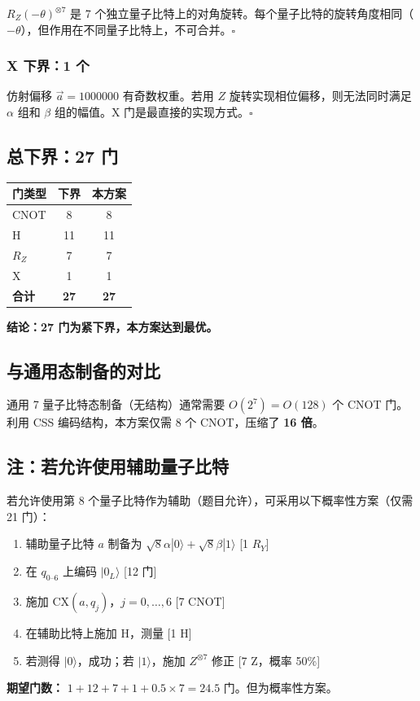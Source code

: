 \documentclass[12pt,a4paper]{ctexart}
\begin{document}
$R_Z(-\theta)^{\otimes 7}$ 是 7 个独立量子比特上的对角旋转。每个量子比特的旋转角度相同（$-\theta$），但作用在不同量子比特上，不可合并。\hfill $\square$

\subsubsection*{X 下界：1 个}

仿射偏移 $\vec{a}=1000000$ 有奇数权重。若用 $Z$ 旋转实现相位偏移，则无法同时满足 $\alpha$ 组和 $\beta$ 组的幅值。X 门是最直接的实现方式。\hfill $\square$

\subsection*{总下界：27 门}

\begin{table}[h]
\centering
\begin{tabular}{lcc}
\toprule
\textbf{门类型} & \textbf{下界} & \textbf{本方案} \\
\midrule
CNOT & 8 & 8 \\
H     & 11 & 11 \\
$R_Z$ & 7 & 7 \\
X     & 1 & 1 \\
\midrule
\textbf{合计} & \textbf{27} & \textbf{27} \\
\bottomrule
\end{tabular}
\end{table}

\textbf{结论：27 门为紧下界，本方案达到最优。}

\subsection*{与通用态制备的对比}

通用 7 量子比特态制备（无结构）通常需要 $O(2^7)=O(128)$ 个 CNOT 门。利用 CSS 编码结构，本方案仅需 8 个 CNOT，压缩了 \textbf{16 倍}。

\subsection*{注：若允许使用辅助量子比特}

若允许使用第 8 个量子比特作为辅助（题目允许），可采用以下概率性方案（仅需 21 门）：

\begin{enumerate}[label=步骤\arabic*.]
    \item 辅助量子比特 $a$ 制备为 $\sqrt{8}\alpha|0\rangle + \sqrt{8}\beta|1\rangle$ \hfill[1 $R_Y$]
    \item 在 $q_{0\text{--}6}$ 上编码 $|0_L\rangle$ \hfill[12 门]
    \item 施加 CX$(a, q_j)$，$j=0,\ldots,6$ \hfill[7 CNOT]
    \item 在辅助比特上施加 H，测量 \hfill[1 H]
    \item 若测得 $|0\rangle$，成功；若 $|1\rangle$，施加 $Z^{\otimes 7}$ 修正 \hfill[7 Z，概率 50\%]
\end{enumerate}

\textbf{期望门数：} $1 + 12 + 7 + 1 + 0.5 \times 7 = 24.5$ 门。但为概率性方案。
\end{document}
